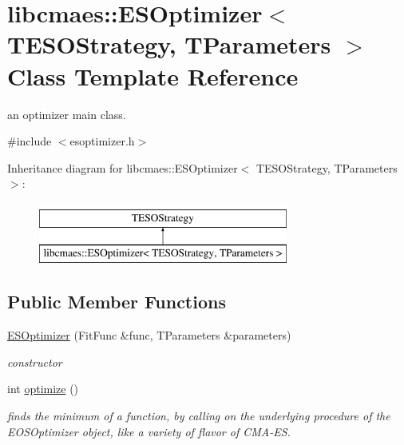 \hypertarget{classlibcmaes_1_1ESOptimizer}{\section{libcmaes\-:\-:E\-S\-Optimizer$<$ T\-E\-S\-O\-Strategy, T\-Parameters $>$ Class Template Reference}
\label{classlibcmaes_1_1ESOptimizer}
}


an optimizer main class.  




{\ttfamily \#include $<$esoptimizer.\-h$>$}

Inheritance diagram for libcmaes\-:\-:E\-S\-Optimizer$<$ T\-E\-S\-O\-Strategy, T\-Parameters $>$\-:\begin{figure}[H]
\begin{center}
\leavevmode
\includegraphics[height=2.000000cm]{classlibcmaes_1_1ESOptimizer}
\end{center}
\end{figure}
\subsection*{Public Member Functions}
\begin{DoxyCompactItemize}
\item 
\hyperlink{classlibcmaes_1_1ESOptimizer_a7c58536329acf5c33e11b882130629d9}{E\-S\-Optimizer} (Fit\-Func \&func, T\-Parameters \&parameters)
\begin{DoxyCompactList}\small\item\em constructor \end{DoxyCompactList}\item 
\hypertarget{classlibcmaes_1_1ESOptimizer_a175e487b798d7a748c28c784256b51c8}{int \hyperlink{classlibcmaes_1_1ESOptimizer_a175e487b798d7a748c28c784256b51c8}{optimize} ()}\label{classlibcmaes_1_1ESOptimizer_a175e487b798d7a748c28c784256b51c8}

\begin{DoxyCompactList}\small\item\em finds the minimum of a function, by calling on the underlying procedure of the E\-O\-S\-Optimizer object, like a variety of flavor of C\-M\-A-\/\-E\-S. \end{DoxyCompactList}\end{DoxyCompactItemize}


